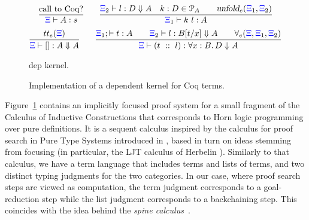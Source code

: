 \begin{footnotesize}
\begin{figure}[t]
  \renewcommand{\Gamma}{}
    \newcommand{\bc}[5]{#1#2\vdash #3 : #4 \Downarrow #5}
\[
\infer{\XXi\Gamma\vdash A : s}
{%
  \mbox{call to Coq?}
}
\qquad
\infer{\XXi_1\Gamma\vdash k\ l : A}
      {\bc{\XXi_2}{\Gamma} l D A \quad k : D \in \Pscr_A\qquad \unfoldExpert{\XXi_1}{\XXi_2}} 
\]
\vskip -18pt
\[
  \infer{\bc {\XXi}{\Gamma} {[]} A A}{\trueExpert{\XXi}}{}\qquad
  \infer{\bc{\XXi}{\Gamma}{(t\ ::\ l)} {\forall x:B.\, D} A}
  {\XXi_1;\Gamma\vdash t : A\qquad \bc{\XXi_2}{\Gamma}l {B[t/x]} A\qquad\prodExpert{\XXi}{\XXi_1}{\XXi_2}}{}
\]
%
\caption{dep kernel.}
\label{fig:augmented}
\end{figure}
\begin{figure}


\caption{Implementation of a  dependent kernel for Coq terms.}
\label{fig:kernel}
\end{figure}
\end{footnotesize}

Figure~\ref{fig:augmented} contains an implicitly focused proof system  for a small fragment of the Calculus of Inductive Constructions that corresponds to Horn logic programming over pure  definitions.
%
It is a sequent calculus inspired by the calculus for
proof search in Pure Type Systems introduced in \cite{LengrandDM06}, based in
 turn on ideas stemming from focusing (in particular, the LJT calculus of
Herbelin \cite{Herbelin94}). Similarly to that calculus, we have a term
language that includes terms and lists of terms, and two distinct typing
judgments for the two categories. In our case, where proof search steps are
viewed as computation, the term judgment corresponds to a goal-reduction
step while the list judgment corresponds to a backchaining step. This coincides
with the idea behind the \emph{spine calculus}~\cite{Cervesato97tr}.

